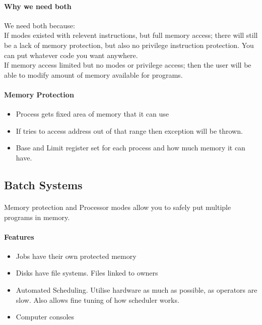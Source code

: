 \documentclass{article}
\newcommand\tab[1][0.5cm]{\hspace*{#1}}
\begin{document}
		\paragraph{Why we need both} We need both because:
		\\\tab If modes existed with relevent instructions, but full memory access; there will still be a lack of memory protection, but also no privilege instruction protection. You can put whatever code you want anywhere.
		\\\tab If memory access limited but no modes or privilege access; then the user will be able to modify amount of memory available for programs.

		\paragraph{\tab Memory Protection}
		\begin{itemize}
			\item Process gets fixed area of memory that it can use
			\item If tries to access address out of that range then exception will be thrown.
			\item Base and Limit register set for each process and how much memory it can have. 
		\end{itemize}

	\subsection{Batch Systems}
		\paragraph{}Memory protection and Processor modes allow you to safely put multiple programs in memory.

		\paragraph{\tab Features}
		\begin{itemize}
			\item Jobs have their own protected memory
			\item Disks have file systems. Files linked to owners
			\item Automated Scheduling. Utilise hardware as much as possible, as operators are slow. Also allows fine tuning of how scheduler works.
			\item Computer consoles
		\end{itemize}
\end{document}

